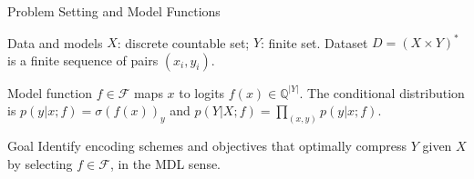 \documentclass{beamer}
\begin{document}
\begin{frame}{Problem Setting and Model Functions}
\small
\begin{block}{Data and models}
$X$: discrete countable set; $Y$: finite set. 
Dataset $D=(X\times Y)^\ast$ is a finite sequence of pairs $(x_i,y_i)$.
\end{block}

\begin{block}{Model function}
$f\in \mathcal{F}$ maps $x$ to logits $f(x)\in \mathbb{Q}^{|Y|}$. The conditional distribution is $p(y|x;f)=\sigma(f(x))_y$ and $p(Y|X;f)=\prod_{(x,y)}p(y|x;f)$.
\end{block}

\begin{block}{Goal}
Identify encoding schemes and objectives that optimally compress $Y$ given $X$ by selecting $f\in\mathcal{F}$, in the MDL sense.
\end{block}
\end{frame}
\end{document}
